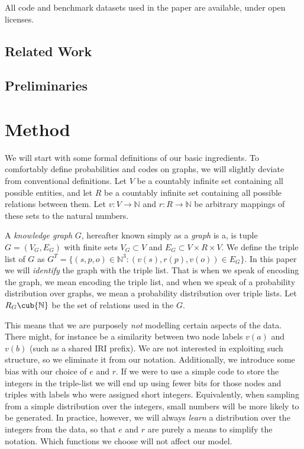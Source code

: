 \documentclass[11pt]{article}
\newcommand{\N}{{\mathbb N}}
\begin{document}
All code and benchmark datasets used in the paper are available, under open licenses.\footnotemark



\subsection{Related Work}

\subsection{Preliminaries}

\section{Method}

We will start with some formal definitions of our basic ingredients. To comfortably define probabilities and codes on graphs, we will slightly deviate from conventional definitions. Let $V$ be a countably infinite set containing all possible entities, and let $R$ be a countably infinite set containing all possible relations between them. Let $v: V \to \N$ and $r: R \to \N$ be arbitrary mappings of these sets to the natural numbers.\footnotemark



A \emph{knowledge graph} $G$, hereafter known simply as a \emph{graph} is a, is tuple $G = (V_G, E_G)$ with finite sets $V_G \subset V$ and $E_G \subset V \times R \times V$. We define the triple list of $G$ as $G^T = \{(s, p, o) \in \N^3 : \left (v(s), r(p), v(o) \right ) \in E_G\}$. In this paper we will \emph{identify} the graph with the triple list. That is when we speak of encoding the graph, we mean encoding the triple list, and when we speak of a probability distribution over graphs, we mean a probability distribution over triple lists. Let $R_G \cub \N$ be the set of relations used in the $G$.

This means that we are purposely \emph{not} modelling certain aspects of the data. There might, for instance be a similarity between two node labels $v(a)$ and $v(b)$ (such as a shared IRI prefix). We are not interested in exploiting such structure, so we eliminate it from our notation. Additionally, we introduce some bias with our choice of $e$ and $r$. If we were to use a simple code to store the integers in the triple-list we will end up using fewer bits for those nodes and triples with labels who were assigned short integers. Equivalently, when sampling from a simple distribution over the integers, small numbers will be more likely to be generated. In practice, however, we will always \emph{learn} a distribution over the integers from the data, so that $e$ and $r$ are purely a means to simplify the notation. Which functions we choose will not affect our model.
\end{document}
